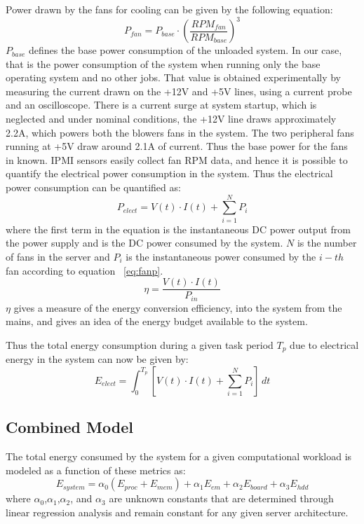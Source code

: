 \documentclass[12pt,onecolumn]{ULieeetran}
\begin{document}
Power drawn by the fans for cooling can be given by the following equation:
\begin{equation*}
\label{eq:fanp}
P_{fan}=  P_{base} \cdot \left(\frac{RPM_{fan}}{RPM_{base}}\right)^3
\end{equation*} 
$P_{base}$ defines the base power consumption of the unloaded system. In our
case, that is the power consumption of the system when running only the
base operating system and no other jobs. That value is obtained
experimentally by measuring the current drawn on the +12V and +5V lines,
using a current probe and an oscilloscope. There is a current surge at
system startup, which is neglected and under nominal conditions, the
+12V line draws approximately 2.2A, which powers both the blowers fans
in the system. The two peripheral fans running at +5V draw around 2.1A
of current.  Thus the base power for the fans in known.  IPMI sensors
easily collect fan RPM data, and hence it is possible to quantify the
electrical power consumption in the system. Thus the electrical power
consumption can be quantified as:
\begin{equation*}
\label{eq:elect}
P_{elect}=  V(t) \cdot I(t) + \sum_{i=1}^NP_{i}
\end{equation*} 
where the first term in the equation is the instantaneous DC power
output from the power supply and is the DC power consumed by the
system. $N$ is the number of fans in the server and $P_{i}$ is the
instantaneous power consumed by the $i-th$ fan according to equation
~\ref{eq:fanp}. 
\begin{equation*}
\label{eq:elect}
\eta=  \frac{V(t) \cdot I(t)}{P_{in}}
\end{equation*} 
$\eta$ gives a measure of the energy conversion efficiency, into the
system from the mains, and gives an idea of the energy budget available
to the system.

Thus the total energy consumption during a given task period $T_{p}$ due
to electrical energy in the system can now be given by:
\begin{equation*}
\label{eq:elect}
E_{elect} =  \int^{T_{p}}_0 [V(t) \cdot I(t) + \sum_{i=1}^NP_{i}]\,dt
\end{equation*} 

\subsection{Combined Model}
\label{sec:wholemodel}

The total energy consumed by the system for a given computational
workload is modeled as a function of these metrics as:
\begin{equation*}
\label{eq:linmodel}
E_{system} =  \alpha_0 (E_{proc} + E_{mem}) + \alpha_1 E_{em} 
+ \alpha_2 E_{board} + \alpha_3 E_{hdd}
\end{equation*}
where $\alpha_{0}$,$\alpha_{1}$,$\alpha_{2}$, and $\alpha_{3}$ are unknown
constants that are determined through linear regression analysis and
remain constant for any given server architecture.
\end{document}
